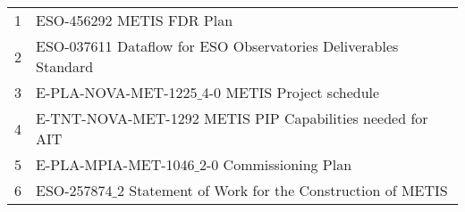 \begin{table}[h!]
\begin{tabularx}{\textwidth}{llll}
\hline\hline
\end{tabularx}			
\tiny
\begin{tabularx}{\textwidth}{ll}
1 & ESO-456292 METIS FDR Plan  \\
2 & ESO-037611 Dataflow for ESO Observatories Deliverables Standard \\
3 & E-PLA-NOVA-MET-1225$\_$4-0 METIS Project schedule \\
4 & E-TNT-NOVA-MET-1292 METIS PIP Capabilities needed for AIT \\ 
5 & E-PLA-MPIA-MET-1046$\_$2-0 Commissioning Plan \\
6 & ESO-257874$\_$2 Statement of Work for the Construction of METIS \\
\end{tabularx} 
\end{table}




